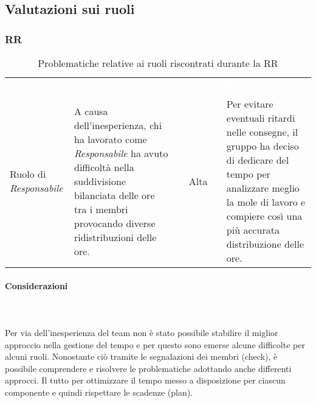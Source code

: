 \subsection{Valutazioni sui ruoli}
\subsubsection{RR}
\begin{table}[H]
\caption{Problematiche relative ai ruoli riscontrati durante la RR}
\begin{center}
\begin{tabular}{ C{2.5cm} L{5cm} c L{5.5cm} }
\textcolor{white}{\textbf{Problema}} & \centerline{\textcolor{white}{\textbf{Descrizione}}} & \textcolor{white}{\textbf{Gravità}} & \centerline{\textcolor{white}{\textbf{Soluzione}}}\\
Ruolo di \textit{Responsabile} & A causa dell'inesperienza, chi ha lavorato come \textit{Responsabile} ha avuto difficoltà nella suddivisione bilanciata delle ore tra i membri provocando diverse ridistribuzioni delle ore. & Alta & Per evitare eventuali ritardi nelle consegne, il gruppo ha deciso di dedicare del tempo per analizzare meglio la mole di lavoro e compiere così una più accurata distribuzione delle ore. \\
\end{tabular}
\end{center}
\end{table}

\paragraph*{Considerazioni}\mbox{} \\ \mbox{} \\
Per via dell'inesperienza del team non è stato possibile stabilire  il miglior approccio nella gestione del tempo e per questo sono emerse alcune difficolte per alcuni ruoli. Nonostante ciò tramite le segnalazioni dei membri (check), è possibile comprendere e risolvere le problematiche adottando anche differenti approcci. Il tutto per ottimizzare il tempo messo a disposizione per ciascun componente e quindi rispettare le scadenze (plan).

